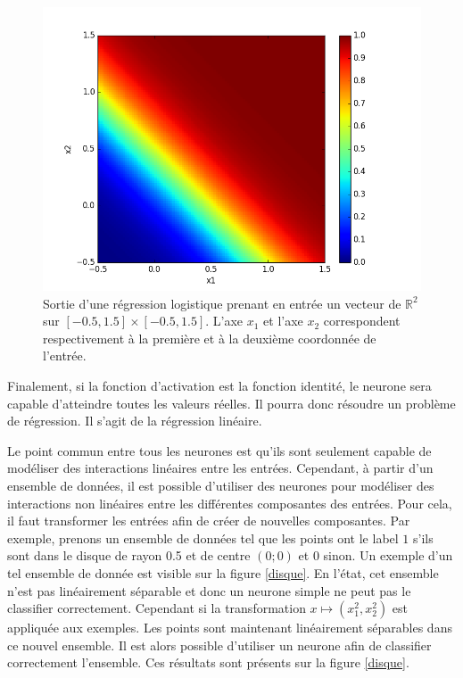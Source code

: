 \documentclass{report}
\begin{document}
\begin{figure}
\begin{center}
\includegraphics[scale=0.5]{images/or.png}
\caption{Sortie d'une régression logistique prenant en entrée un vecteur de $\mathbb{R}^2$ sur $[-0.5, 1.5] \times [-0.5, 1.5]$. L'axe $x_1$ et l'axe $x_2$ correspondent respectivement à la première et à la deuxième coordonnée de l'entrée.}
\label{regression_logistique}
\end{center}
\end{figure}

Finalement, si la fonction d'activation est la fonction identité, le neurone sera capable d'atteindre toutes les valeurs réelles. Il pourra donc résoudre un problème de régression. Il s'agit de la régression linéaire.

Le point commun entre tous les neurones est qu'ils sont seulement capable de modéliser des interactions linéaires entre les entrées. Cependant, à partir d'un ensemble de données, il est possible d'utiliser des neurones pour modéliser des interactions non linéaires entre les différentes composantes des entrées. Pour cela, il faut transformer les entrées afin de créer de nouvelles composantes. Par exemple, prenons un ensemble de données tel que les points ont le label $1$ s'ils sont dans le disque de rayon 0.5 et de centre $(0;0)$ et $0$ sinon. Un exemple d'un tel ensemble de donnée est visible sur la figure \ref{disque}. En l'état, cet ensemble n'est pas linéairement séparable et donc un neurone simple ne peut pas le classifier correctement. Cependant si la transformation $x \mapsto (x_1^2, x_2^2)$ est appliquée aux exemples. Les points sont maintenant linéairement séparables dans ce nouvel ensemble. Il est alors possible d'utiliser un neurone afin de classifier correctement l'ensemble. Ces résultats sont présents sur la figure \ref{disque}.
\end{document}
